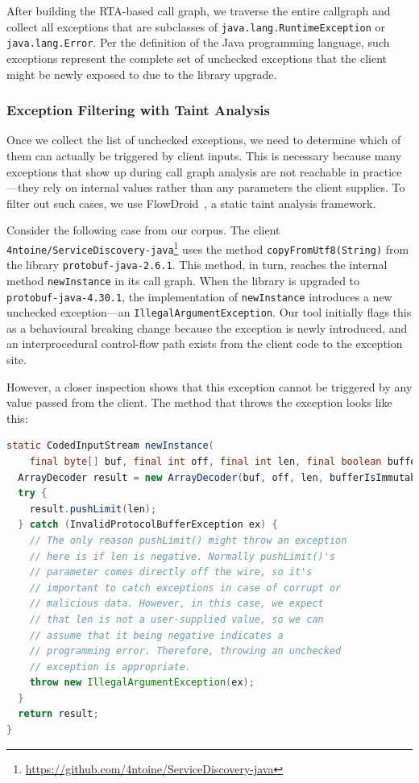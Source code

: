 After building the RTA-based call graph, we traverse the entire callgraph and collect all exceptions that are subclasses of \texttt{java.lang.RuntimeException} or \texttt{java.lang.Error}. Per the definition of the Java programming language, such exceptions represent the complete set of unchecked exceptions that the client might be newly exposed to due to the library upgrade.

\subsubsection{Exception Filtering with Taint Analysis}

Once we collect the list of unchecked exceptions, we need to determine which of them can actually be triggered by client inputs. This is necessary because many exceptions that show up during call graph analysis are not reachable in practice—they rely on internal values rather than any parameters the client supplies. To filter out such cases, we use FlowDroid~\cite{Arzt14:_flowdroid}, a static taint analysis framework.

Consider the following case from our corpus. The client \texttt{4ntoine/ServiceDiscovery-java}\footnote{\url{https://github.com/4ntoine/ServiceDiscovery-java}} uses the method \texttt{copyFromUtf8(String)} from the library \texttt{protobuf-java-2.6.1}. This method, in turn, reaches the internal method \texttt{newInstance} in its call graph. When the library is upgraded to \texttt{protobuf-java-4.30.1}, the implementation of \texttt{newInstance} introduces a new unchecked exception—an \texttt{IllegalArgumentException}. Our tool initially flags this as a behavioural breaking change because the exception is newly introduced, and an interprocedural control-flow path exists from the client code to the exception site.

However, a closer inspection shows that this exception cannot be triggered by any value passed from the client. The method that throws the exception looks like this:

\begin{lstlisting}[language=Java,breaklines=true,basicstyle=\scriptsize\ttfamily]
static CodedInputStream newInstance(
    final byte[] buf, final int off, final int len, final boolean bufferIsImmutable) {
  ArrayDecoder result = new ArrayDecoder(buf, off, len, bufferIsImmutable);
  try {
    result.pushLimit(len);
  } catch (InvalidProtocolBufferException ex) {
    // The only reason pushLimit() might throw an exception
    // here is if len is negative. Normally pushLimit()'s
    // parameter comes directly off the wire, so it's 
    // important to catch exceptions in case of corrupt or
    // malicious data. However, in this case, we expect 
    // that len is not a user-supplied value, so we can 
    // assume that it being negative indicates a 
    // programming error. Therefore, throwing an unchecked 
    // exception is appropriate.
    throw new IllegalArgumentException(ex);
  }
  return result;
}
\end{lstlisting}

